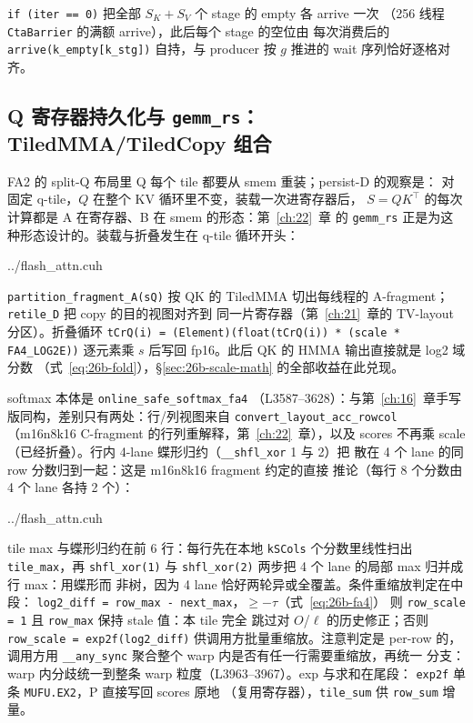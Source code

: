 \texttt{if (iter == 0)} 把全部 $S_K{+}S_V$ 个 stage 的 empty 各 arrive 一次
（256 线程 \texttt{CtaBarrier} 的满额 arrive），此后每个 stage 的空位由
每次消费后的 \texttt{arrive(k\_empty[k\_stg])} 自持，与 producer 按 $g$
推进的 wait 序列恰好逐格对齐。
\subsection{Q 寄存器持久化与 \texttt{gemm\_rs}：TiledMMA/TiledCopy 组合}\label{sec:26b-persistq}

FA2 的 split-Q 布局里 Q 每个 tile 都要从 smem 重装；persist-D 的观察是：
对固定 q-tile，$Q$ 在整个 KV 循环里不变，装载一次进寄存器后，
$S = QK^\top$ 的每次计算都是 A 在寄存器、B 在 smem 的形态：第~\ref{ch:22}~章
的 \texttt{gemm\_rs} 正是为这种形态设计的。装载与折叠发生在 q-tile 循环开头：

\begin{lstinputlisting}[linerange={3883-3892},firstnumber=auto,
  title={flash\_attn.cuh L3883-3892（Q s2r 一次 + scale$\cdot\log_2 e$ 折叠进 A-fragment）}]{../flash_attn.cuh}
\end{lstinputlisting}

\texttt{partition\_\allowbreak{}fragment\_\allowbreak{}A(sQ)} 按 QK 的
TiledMMA 切出每线程的 A-fragment；\texttt{retile\_D} 把 copy 的目的视图对齐到
同一片寄存器（第~\ref{ch:21}~章的 TV-layout 分区）。折叠循环
\texttt{tCrQ(i) = (Element)(float(tCrQ(i)) * (scale * FA4\_LOG2E))} 逐元素乘
$s$ 后写回 fp16。此后 QK 的 HMMA 输出直接就是 log2 域分数
（式~\eqref{eq:26b-fold}），\S\ref{sec:26b-scale-math} 的全部收益在此兑现。

softmax 本体是 \texttt{online\_\allowbreak{}safe\_\allowbreak{}softmax\_\allowbreak{}fa4}
（L3587--3628）：与第~\ref{ch:16}~章手写版同构，差别只有两处：行/列视图来自
\texttt{convert\_\allowbreak{}layout\_\allowbreak{}acc\_\allowbreak{}rowcol}
（m16n8k16 C-fragment 的行列重解释，第~\ref{ch:22}~章），以及 scores 不再乘
scale（已经折叠）。行内 4-lane 蝶形归约（\texttt{\_\_shfl\_xor} 1 与 2）把
散在 4 个 lane 的同 row 分数归到一起：这是 m16n8k16 fragment 约定的直接
推论（每行 8 个分数由 4 个 lane 各持 2 个）：

\begin{lstinputlisting}[linerange={3587-3628},firstnumber=auto,
  title={flash\_attn.cuh L3587-3628（\texttt{online\_safe\_softmax\_fa4}：log2 域 + 条件重缩放全函数）}]{../flash_attn.cuh}
\end{lstinputlisting}

tile max 与蝶形归约在前 6 行：每行先在本地
\texttt{kSCols} 个分数里线性扫出 \texttt{tile\_max}，再 \texttt{shfl\_xor(1)} 与
\texttt{shfl\_xor(2)} 两步把 4 个 lane 的局部 max 归并成行 max：用蝶形而
非树，因为 4 lane 恰好两轮异或全覆盖。条件重缩放判定在中段：
\texttt{log2\_diff = row\_max - next\_max}，$\ge -\tau$（式~\eqref{eq:26b-fa4}）
则 \texttt{row\_scale = 1} 且 \texttt{row\_max} 保持 stale 值：本 tile 完全
跳过对 $O$/$\ell$ 的历史修正；否则 \texttt{row\_scale = exp2f(log2\_diff)}
供调用方批量重缩放。注意判定是 per-row 的，调用方用
\texttt{\_\_any\_sync} 聚合整个 warp 内是否有任一行需要重缩放，再统一
分支：warp 内分歧统一到整条 warp 粒度（L3963--3967）。exp 与求和在尾段：
\texttt{exp2f} 单条 \texttt{MUFU.EX2}，P 直接写回 scores 原地
（复用寄存器），\texttt{tile\_sum} 供 \texttt{row\_sum} 增量。

